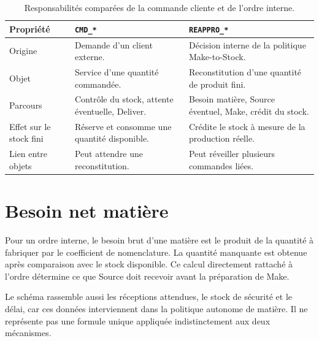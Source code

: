 
\begin{table}[H]
  \centering
  \begin{tabularx}{\textwidth}{L{0.20\textwidth} Y Y}
    \toprule
    Propriété & \texttt{CMD\_*} & \texttt{REAPPRO\_*} \\
    \midrule
    Origine & Demande d'un client externe. & Décision interne de la politique Make-to-Stock. \\
    Objet & Service d'une quantité commandée. & Reconstitution d'une quantité de produit fini. \\
    Parcours & Contrôle du stock, attente éventuelle, Deliver. & Besoin matière, Source éventuel, Make, crédit du stock. \\
    Effet sur le stock fini & Réserve et consomme une quantité disponible. & Crédite le stock à mesure de la production réelle. \\
    Lien entre objets & Peut attendre une reconstitution. & Peut réveiller plusieurs commandes liées. \\
    \bottomrule
  \end{tabularx}
  \caption{Responsabilités comparées de la commande cliente et de l'ordre interne.}
  \label{tab:cmd-reappro}
\end{table}


\section{Besoin net matière}

Pour un ordre interne, le besoin brut d'une matière est le produit de la quantité à fabriquer par le coefficient de nomenclature. La quantité manquante est obtenue après comparaison avec le stock disponible. Ce calcul directement rattaché à l'ordre détermine ce que Source doit recevoir avant la préparation de Make.


Le schéma rassemble aussi les réceptions attendues, le stock de sécurité et le délai, car ces données interviennent dans la politique autonome de matière. Il ne représente pas une formule unique appliquée indistinctement aux deux mécanismes.

